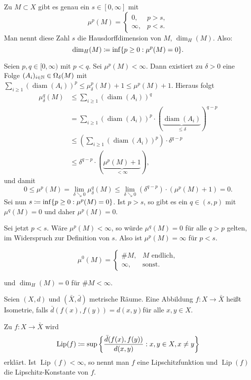 \documentclass[a4paper,twoside,DIV15,BCOR12mm]{scrbook}
\DeclareMathOperator{\diam}{diam}
\DeclareMathOperator{\Lip}{Lip}
\DeclareMathOperator{\downto}{\searrow}
\begin{document}
\begin{proposition}
\label{prop:2.21}
Zu \(M \subset X\) gibt es genau ein \(s\in[0,\infty]\) mit
\[
\mu^p(M) = \begin{cases} 0, & p>s, \\ \infty, & p<s. \end{cases}
\]
Man nennt diese Zahl \(s\) die Hausdorffdimension von \(M\), \(\dim_H(M)\). Also:
\[
\dim_H(M) \da \inf\{p\geq0 : \mu^p(M)=0\}.
\]

\end{proposition}

\begin{beweis}
Seien \(p,q \in [0,\infty)\) mit \(p<q\). Sei \(\mu^p(M)<\infty\). Dann existiert zu \(\delta>0\) eine Folge \((A_i)_{i\in\mathbb{N}} \in \Omega_\delta(M)\) mit \(\sum_{i\geq1} {(\diam(A_i))}^p \leq \mu_\delta^p(M)+1 \leq \mu^p(M)+1\). Hieraus folgt
\begin{align*}
\mu_\delta^q(M) &
\leq \sum_{i\geq1} {(\diam(A_i))}^q \\ &
= \sum_{i\geq1} (\diam(A_i))^p \cdot (\underbrace{\diam(A_i)}_{\leq\delta})^{q-p} \\ &
\leq (\sum_{i\geq1} (\diam(A_i))^p)\cdot \delta^{q-p} \\ &
\leq \delta^{q-p}\cdot (\underbrace{\mu^p(M)+1}_{<\infty}),
\end{align*}
und damit
\[
0 \leq \mu^p(M) = \lim_{\delta\downto0} \mu_\delta^q(M) \leq \lim_{\delta\downto0}(\delta^{q-p})\cdot(\mu^p(M)+1) = 0.
\]
Sei nun \(s \da \inf\{p\geq0 : \mu^p(M) = 0\}\). Ist \(p>s\), so gibt es ein \(q\in(s,p)\) mit \(\mu^q(M) = 0\) und daher \(\mu^p(M)=0\).
\par
Sei jetzt \(p<s\). Wäre \(\mu^p(M)<\infty\), so würde \(\mu^q(M)=0\) für alle \(q>p\) gelten, im Widerspruch zur Definition von \(s\). Also ist \(\mu^p(M)=\infty\) für \(p<s\).
\end{beweis}

\begin{beispiel}
$$
\mu^0(M) = \begin{cases} \#M, & M \text{ endlich}, \\ \infty, & \text{sonst}. \end{cases}
$$
\par
und \(\dim_H(M) = 0\) für \(\#M < \infty\).
\end{beispiel}

\begin{definition}
Seien \((X,d)\) und \((\bar X,\bar d)\) metrische Räume. Eine Abbildung \(f: X \rightarrow \bar X\) heißt Isometrie, falls \(\bar d(f(x),f(y)) = d(x,y)\)für alle $ x,y\in X$. 
\par
Zu \(f:X \rightarrow \bar X\) wird
\[
\Lip(f) \da \sup\left\{\frac{\bar d(f(x),f(y))}{d(x,y)} : x,y \in X, x\neq y\right\}
\]
erklärt. Ist \(\Lip(f)<\infty\), so nennt man \(f\) eine Lipschitzfunktion und \(\Lip(f)\) die Lipschitz-Konstante von \(f\).
\end{definition}
\end{document}

